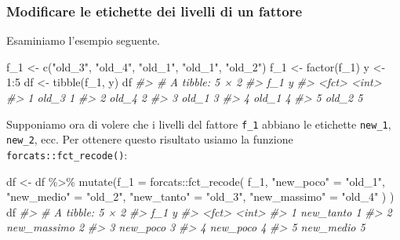 \documentclass[
  10pt,
  italian,
  a4paper,
  extrafontsizes,onecolumn,openright
  ]{memoir}
\newenvironment{Shaded}{\begin{snugshade}}{\end{snugshade}}
\newcommand{\AttributeTok}[1]{\textcolor[rgb]{0.77,0.63,0.00}{#1}}
\newcommand{\CommentTok}[1]{\textcolor[rgb]{0.56,0.35,0.01}{\textit{#1}}}
\newcommand{\DecValTok}[1]{\textcolor[rgb]{0.00,0.00,0.81}{#1}}
\newcommand{\FunctionTok}[1]{\textcolor[rgb]{0.00,0.00,0.00}{#1}}
\newcommand{\NormalTok}[1]{#1}
\newcommand{\OtherTok}[1]{\textcolor[rgb]{0.56,0.35,0.01}{#1}}
\newcommand{\SpecialCharTok}[1]{\textcolor[rgb]{0.00,0.00,0.00}{#1}}
\newcommand{\StringTok}[1]{\textcolor[rgb]{0.31,0.60,0.02}{#1}}
\begin{document}
\hypertarget{modificare-le-etichette-dei-livelli-di-un-fattore}{%
\subsubsection{Modificare le etichette dei livelli di un fattore}\label{modificare-le-etichette-dei-livelli-di-un-fattore}}

Esaminiamo l'esempio seguente.

\begin{Shaded}
\begin{Highlighting}[]
\NormalTok{f\_1 }\OtherTok{\textless{}{-}} \FunctionTok{c}\NormalTok{(}\StringTok{"old\_3"}\NormalTok{, }\StringTok{"old\_4"}\NormalTok{, }\StringTok{"old\_1"}\NormalTok{, }\StringTok{"old\_1"}\NormalTok{, }\StringTok{"old\_2"}\NormalTok{)}
\NormalTok{f\_1 }\OtherTok{\textless{}{-}} \FunctionTok{factor}\NormalTok{(f\_1)}
\NormalTok{y }\OtherTok{\textless{}{-}} \DecValTok{1}\SpecialCharTok{:}\DecValTok{5}
\NormalTok{df }\OtherTok{\textless{}{-}} \FunctionTok{tibble}\NormalTok{(f\_1, y)}
\NormalTok{df}
\CommentTok{\#\textgreater{} \# A tibble: 5 × 2}
\CommentTok{\#\textgreater{}   f\_1       y}
\CommentTok{\#\textgreater{}   \textless{}fct\textgreater{} \textless{}int\textgreater{}}
\CommentTok{\#\textgreater{} 1 old\_3     1}
\CommentTok{\#\textgreater{} 2 old\_4     2}
\CommentTok{\#\textgreater{} 3 old\_1     3}
\CommentTok{\#\textgreater{} 4 old\_1     4}
\CommentTok{\#\textgreater{} 5 old\_2     5}
\end{Highlighting}
\end{Shaded}

\noindent
Supponiamo ora di volere che i livelli del fattore \texttt{f\_1} abbiano le etichette \texttt{new\_1}, \texttt{new\_2}, ecc. Per ottenere questo risultato usiamo la funzione \texttt{forcats::fct\_recode()}:

\begin{Shaded}
\begin{Highlighting}[]
\NormalTok{df }\OtherTok{\textless{}{-}}\NormalTok{ df }\SpecialCharTok{\%\textgreater{}\%}
  \FunctionTok{mutate}\NormalTok{(}\AttributeTok{f\_1 =}
\NormalTok{    forcats}\SpecialCharTok{::}\FunctionTok{fct\_recode}\NormalTok{(}
\NormalTok{      f\_1, }
      \StringTok{"new\_poco"} \OtherTok{=} \StringTok{"old\_1"}\NormalTok{, }
      \StringTok{"new\_medio"} \OtherTok{=} \StringTok{"old\_2"}\NormalTok{, }
      \StringTok{"new\_tanto"} \OtherTok{=} \StringTok{"old\_3"}\NormalTok{, }
      \StringTok{"new\_massimo"} \OtherTok{=} \StringTok{"old\_4"}
\NormalTok{      )}
\NormalTok{   )}
\NormalTok{df}
\CommentTok{\#\textgreater{} \# A tibble: 5 × 2}
\CommentTok{\#\textgreater{}   f\_1             y}
\CommentTok{\#\textgreater{}   \textless{}fct\textgreater{}       \textless{}int\textgreater{}}
\CommentTok{\#\textgreater{} 1 new\_tanto       1}
\CommentTok{\#\textgreater{} 2 new\_massimo     2}
\CommentTok{\#\textgreater{} 3 new\_poco        3}
\CommentTok{\#\textgreater{} 4 new\_poco        4}
\CommentTok{\#\textgreater{} 5 new\_medio       5}
\end{Highlighting}
\end{Shaded}
\end{document}
